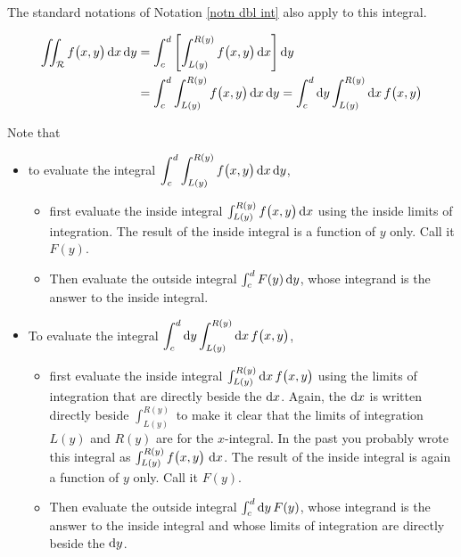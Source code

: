 The standard notations of Notation \ref{notn dbl int} also
apply to this integral.
\begin{notn}\label{notn dbl int again}
\begin{align*}
\iint_{\mathcal{R}} f\big(x,y\big)\,\mathrm{d}x\,\mathrm{d}y
&=\int_c^d \left[\int_{L(y)}^{R(y)} f\big(x,y\big)\,\mathrm{d}x\right]\mathrm{d}y \\
&=\int_c^d \int_{L(y)}^{R(y)} f\big(x,y\big)\,\mathrm{d}x\,\mathrm{d}y
=\int_c^d \mathrm{d}y \int_{L(y)}^{R(y)} \mathrm{d}x\, f\big(x,y\big)
\end{align*}
\end{notn}
Note that
\begin{itemize}
\item 
to evaluate the integral 
$\displaystyle\int_c^d \int_{L(y)}^{R(y)} f\big(x,y\big)\,\mathrm{d}x\,\mathrm{d}y$,
\begin{itemize}
  \item
  first evaluate the inside integral 
  $\int_{L(y)}^{R(y)} f\big(x,y\big)\,\mathrm{d}x$ using the inside
  limits of integration. The result of the inside integral is a function
  of $y$ only.  Call it $F(y)$.
  \item
   Then evaluate the outside integral $\int_c^d F(y)\,\mathrm{d}y$,
   whose integrand is the answer to the inside integral.
\end{itemize}

\item
To evaluate the integral 
$\displaystyle\int_c^d \mathrm{d}y \int_{L(y)}^{R(y)} \mathrm{d}x\, f\big(x,y\big)$,
\begin{itemize}
  \item
  first evaluate the inside integral 
  $\int_{L(y)}^{R(y)} \mathrm{d}x\, f\big(x,y\big)$ using the limits of 
  integration that are directly beside the $\mathrm{d}x$. 
  Again, the $\mathrm{d}x$
  is written directly beside $\int_{L(y)}^{R(y)}$ to make it clear that
  the limits of integration $L(y)$ and $R(y)$ are for the $x$-integral.
  In the past you probably wrote this integral as 
  $\int_{L(y)}^{R(y)} f\big(x,y\big)\ \mathrm{d}x$.
  The result of the inside integral is again a function of $y$ only.  
  Call it $F(y)$.
  \item
   Then evaluate the outside integral $\int_c^d \mathrm{d}y\,F(y)$,
   whose integrand is the answer to the inside integral and whose limits
   of integration are directly beside the $\mathrm{d}y$.
\end{itemize}
\end{itemize}

